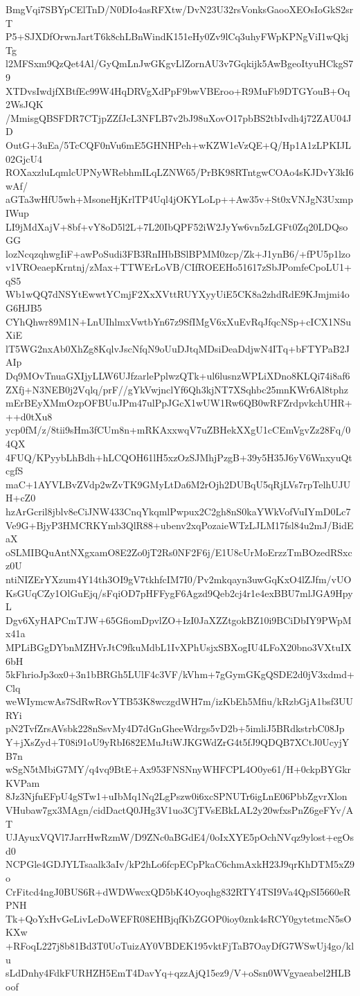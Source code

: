 BmgVqi7SBYpCElTnD/N0DIo4asRFXtw/DvN23U32rsVonksGaooXEOsIoGkS2srT
P5+SJXDfOrwnJartT6k8chLBnWindK151eHy0Zv9lCq3uhyFWpKPNgViI1wQkjTg
l2MFSxm9QzQet4Al/GyQmLnJwGKgvLlZornAU3v7Gqkijk5AwBgeoItyuHCkgS79
XTDvsIwdjfXBtfEc99W4HqDRVgXdPpF9bwVBEroo+R9MuFb9DTGYouB+Oq2WsJQK
/MmisgQBSFDR7CTjpZZfJcL3NFLB7v2bJ98uXovO17pbBS2tbIvdh4j72ZAU04JD
OutG+3uEa/5TcCQF0nVu6mE5GHNHPeh+wKZW1eVzQE+Q/Hp1A1zLPKIJL02GjcU4
ROXaxzluLqmlcUPNyWRebhmILqLZNW65/PrBK98RTntgwCOAo4sKJDvY3kI6wAf/
aGTa3wHfU5wh+MsoneHjKrlTP4Uql4jOKYLoLp++Aw35v+St0xVNJgN3UxmpIWup
LI9jMdXajV+8bf+vY8oD5l2L+7L20IbQPF52iW2JyYw6vn5zLGFt0Zq20LDQsoGG
lozNcqzqhwgIiF+awPoSudi3FB3RnIHbBSlBPMM0zcp/Zk+J1ynB6/+fPU5p1lzo
v1VROeaepKrntnj/zMax+TTWErLoVB/CIfROEEHo51617zSbJPomfeCpoLU1+qS5
Wb1wQQ7dNSYtEwwtYCmjF2XxXVttRUYXyyUiE5CK8a2zhdRdE9KJmjmi4oG6HJB5
CYhQhwr89M1N+LnUIhlmxVwtbYn67z9SfIMgV6xXuEvRqJfqcNSp+cICX1NSuXiE
lT5WG2nxAb0XhZg8KqlvJscNfqN9oUuDJtqMDsiDeaDdjwN4ITq+bFTYPaB2JAIp
Dq9MOvTnuaGXIjyLLW6UJfzarlePplwzQTk+ul6lusnzWPLiXDno8KLQi74i8af6
ZXfj+N3NEB0j2Vqlq/prF//gYkVwjnclYf6Qh3kjNT7XSqhbc25mnKWr6Al8tphz
mErBEyXMmOzpOFBUuJPm47ulPpJGcX1wUW1Rw6QB0wRFZrdpvkchUHR+++d0tXu8
ycp0fM/z/8tii9sHm3fCUm8n+mRKAxxwqV7uZBHekXXgU1cCEmVgvZz28Fq/04QX
4FUQ/KPyybLhBdh+hLCQOH61lH5xzOzSJMhjPzgB+39y5H35J6yV6WnxyuQtcgfS
maC+1AYVLBvZVdp2wZvTK9GMyLtDa6M2rOjh2DUBqU5qRjLVs7rpTelhUJUH+cZ0
hzArGcril8jblv8eCiJNW433CnqYkqmlPwpux2C2gh8nS0kaYWkVofVuIYmD0Lc7
Ve9G+BjyP3HMCRKYmb3QlR88+ubenv2xqPozaieWTzLJLM17fsl84u2mJ/BidEaX
oSLMIBQuAntNXgxamO8E2Zo0jT2Rs0NF2F6j/E1U8cUrMoErzzTmBOzedRSxcz0U
ntiNIZErYXzum4Y14th3OI9gV7tkhfcIM7I0/Pv2mkqayn3uwGqKxO4lZJfm/vUO
KsGUqCZy1OlGuEjq/sFqiOD7pHFFygF6Agzd9Qeb2cj4r1e4exBBU7mlJGA9HpyL
Dgv6XyHAPCmTJW+65GfiomDpvlZO+IzI0JaXZZtgokBZ10i9BCiDbIY9PWpMx41a
MPLiBGgDYbnMZHVrJtC9fkuMdbL1IvXPhUsjxSBXogIU4LFoX20bno3VXtuIX6bH
5kFhrioJp3ox0+3n1bBRGh5LUlF4c3VF/kVhm+7gGymGKgQSDE2d0jV3xdmd+Clq
weWIymcwAs7SdRwRovYTB53K8wczgdWH7m/izKbEh5Mfiu/kRzbGjA1bsf3UURYi
pN2TvfZrsAVsbk228nSsvMy4D7dGnGheeWdrgs5vD2b+5imliJ5BRdkstrbC08Jp
Y+jXsZyd+T08i91oU9yRbI682EMuJtiWJKGWdZrG4t5fJ9QDQB7XCtJ0UcyjYB7n
wSgN5tMbiG7MY/q4vq9BtE+Ax953FNSNnyWHFCPL4O0ye61/H+0ckpBYGkrKVPam
8Jz3NjfuEFpU4gSTw1+uIbMq1Nq2LgPszw0i6xcSPNUTr6igLnE06PbbZgvrXlon
VHubaw7gx3MAgn/cidDactQ0JHg3V1uo3CjTVsEBkLAL2y20wfxsPnZ6geFYv/AT
UJAyuxVQVl7JarrHwRzmW/D9ZNc0aBGdE4/0oIxXYE5pOchNVqz9ylost+egOsd0
NCPGle4GDJYLTsaalk3aIv/kP2hLo6fcpECpPkaC6chmAxkH23J9qrKhDTM5xZ9o
CrFitcd4ngJ0BUS6R+dWDWwcxQD5bK4Oyoqhg832RTY4TSI9Va4QpSI5660eRPNH
Tk+QoYxHvGeLivLeDoWEFR08EHBjqfKbZGOP0ioy0znk4sRCY0gytetmcN5sOKXw
+RFoqL227j8b81Bd3T0UoTuizAY0VBDEK195vktFjTaB7OayDfG7WSwUj4go/klu
sLdDnhy4FdkFURHZH5EmT4DavYq+qzzAjQ15ez9/V+oSsn0WVgyaeabel2HLBoof

